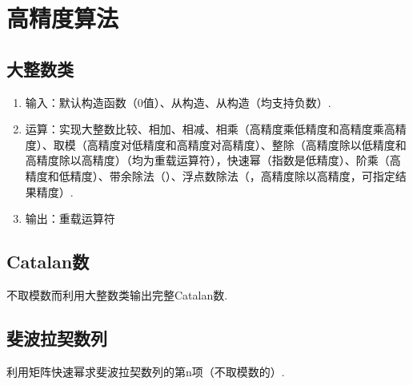 \newpage
\section{高精度算法}
\subsection{大整数类}
\begin{enumerate}[label = {\textup{(\arabic*)}}]
    \item 输入：默认构造函数（0值）、从构造、从构造（均支持负数）.
    \item 运算：实现大整数比较、相加、相减、相乘（高精度乘低精度和高精度乘高精度）、取模（高精度对低精度和高精度对高精度）、整除（高精度除以低精度和高精度除以高精度）（均为重载运算符），快速幂（指数是低精度）、阶乘（高精度和低精度）、带余除法（）、浮点数除法（，高精度除以高精度，可指定结果精度）.
    \item 输出：重载\inline{<<}运算符
\end{enumerate}
\subsection{Catalan数}
不取模数而利用大整数类输出完整Catalan数.
\subsection{斐波拉契数列}
利用矩阵快速幂求斐波拉契数列的第n项（不取模数的）.
